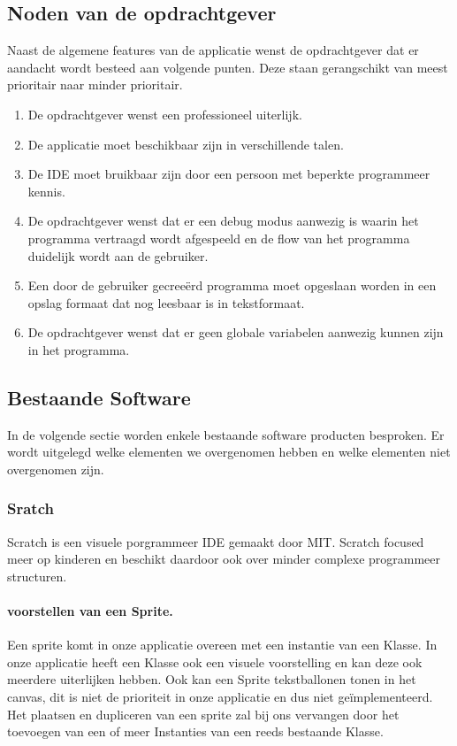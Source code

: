 \documentclass[]{article}
\begin{document}
\subsection{Noden van de opdrachtgever}
\label{Noden}
Naast de algemene features van de applicatie wenst de opdrachtgever dat er aandacht wordt besteed aan volgende punten. Deze staan gerangschikt van meest prioritair naar minder prioritair.
\begin{enumerate}
\item De opdrachtgever wenst een professioneel uiterlijk.
\item De applicatie moet beschikbaar zijn in verschillende talen.
\item De IDE moet bruikbaar zijn door een persoon met beperkte programmeer kennis.
\item De opdrachtgever wenst dat er een debug modus aanwezig is waarin het programma vertraagd wordt afgespeeld en de flow van het programma duidelijk wordt aan de gebruiker.
\item Een door de gebruiker gecree\"{e}rd programma moet opgeslaan worden in een opslag formaat  dat nog leesbaar is in tekstformaat.
\item De opdrachtgever wenst dat er geen globale variabelen aanwezig kunnen zijn in het programma.
\end{enumerate}
 
\subsection{Bestaande Software}
In de volgende sectie worden enkele bestaande software producten besproken. Er wordt uitgelegd welke elementen we overgenomen hebben en welke elementen niet overgenomen zijn.
\label{software}
\subsubsection{Sratch}
Scratch \cite{scratch} is een visuele porgrammeer IDE gemaakt door MIT. Scratch focused meer op kinderen en beschikt daardoor ook over minder complexe programmeer structuren.
\paragraph{ voorstellen van een Sprite.}
Een sprite komt in onze applicatie overeen met een instantie van een Klasse. In onze applicatie heeft een Klasse ook een visuele voorstelling en kan deze ook meerdere uiterlijken hebben. Ook kan een Sprite tekstballonen tonen in het canvas, dit is niet de prioriteit in onze applicatie en dus niet ge\"implementeerd. Het plaatsen en dupliceren van een sprite zal bij ons vervangen door het toevoegen van een of meer Instanties van een reeds bestaande Klasse.
\end{document}
